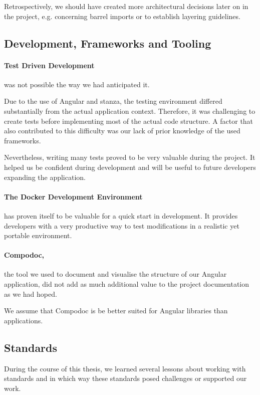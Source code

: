 Retrospectively, we should have created more architectural decisions later on in the project, e.g. concerning barrel imports or to establish layering guidelines.

\subsection{Development, Frameworks and Tooling}

\paragraph{Test Driven Development} was not possible the way we had anticipated it.

Due to the use of Angular and stanza, the testing environment differed substantially from the actual application context.
Therefore, it was challenging to create tests before implementing most of the actual code structure.
A factor that also contributed to this difficulty was our lack of prior knowledge of the used frameworks.

Nevertheless, writing many tests proved to be very valuable during the project.
It helped us be confident during development and will be useful to future developers expanding the application.

\paragraph{The Docker Development Environment} has proven itself to be valuable for a quick start in development.
It provides developers with a very productive way to test modifications in a realistic yet portable environment.

\paragraph{Compodoc,} the tool we used to document and visualise the structure of our Angular application,
did not add as much additional value to the project documentation as we had hoped.

We assume that Compodoc is be better suited for Angular libraries than applications.

\subsection{Standards}\label{lessons-learned-standards}

During the course of this thesis, we learned several lessons about working with standards and in which way these standards posed challenges or supported our work.

